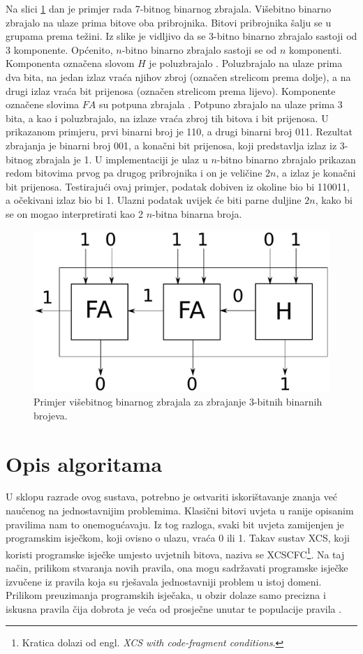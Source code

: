 \documentclass[times, utf8, zavrsni]{fer}
\begin{document}
Na slici \ref{img:caex} dan je primjer rada 7-bitnog binarnog zbrajala.
Višebitno binarno zbrajalo na ulaze prima bitove oba pribrojnika.
Bitovi pribrojnika šalju se u grupama prema težini.
Iz slike je vidljivo da se 3-bitno binarno zbrajalo sastoji od 3 komponente.
Općenito, $n$-bitno binarno zbrajalo sastoji se od $n$ komponenti.
Komponenta označena slovom $H$ je poluzbrajalo .
Poluzbrajalo na ulaze prima dva bita, na jedan izlaz vraća njihov zbroj (označen strelicom prema dolje), a na drugi izlaz vraća bit prijenosa (označen strelicom prema lijevo).
Komponente označene slovima $FA$ su potpuna zbrajala .
Potpuno zbrajalo na ulaze prima 3 bita, a kao i poluzbrajalo, na izlaze vraća zbroj tih bitova i bit prijenosa.
U prikazanom primjeru, prvi binarni broj je 110, a drugi binarni broj 011.
Rezultat zbrajanja je binarni broj 001, a konačni bit prijenosa, koji predstavlja izlaz iz 3-bitnog zbrajala je 1.
U implementaciji je ulaz u $n$-bitno binarno zbrajalo prikazan redom bitovima prvog pa drugog pribrojnika i on je veličine $2n$, a izlaz je konačni bit prijenosa.
Testirajući ovaj primjer, podatak dobiven iz okoline bio bi 110011, a očekivani izlaz bio bi 1.
Ulazni podatak uvijek će biti parne duljine $2n$, kako bi se on mogao interpretirati kao 2 $n$-bitna binarna broja.
\begin{figure}[!h]
    \centering
    \includegraphics[width=13cm]{img/fa.pdf}
    \caption{Primjer višebitnog binarnog zbrajala za zbrajanje 3-bitnih binarnih brojeva.}
    \label{img:caex}
\end{figure}

\chapter{Opis algoritama} \label{ch:algs}
U sklopu razrade ovog sustava, potrebno je ostvariti iskorištavanje znanja već naučenog na jednostavnijim problemima.
Klasični bitovi uvjeta u ranije opisanim pravilima nam to onemogućavaju.
Iz tog razloga, svaki bit uvjeta zamijenjen je programskim isječkom, koji ovisno o ulazu, vraća 0 ili 1.
Takav sustav XCS, koji koristi programske isječke umjesto uvjetnih bitova, naziva se XCSCFC\footnote{Kratica dolazi od engl. \emph{XCS with code-fragment conditions}.}.
Na taj način, prilikom stvaranja novih pravila, ona mogu sadržavati programske isječke izvučene iz pravila koja su rješavala jednostavniji problem u istoj domeni.
Prilikom preuzimanja programskih isječaka, u obzir dolaze samo precizna i iskusna pravila čija dobrota  je veća od prosječne unutar te populacije pravila \citep{4}.
\end{document}
